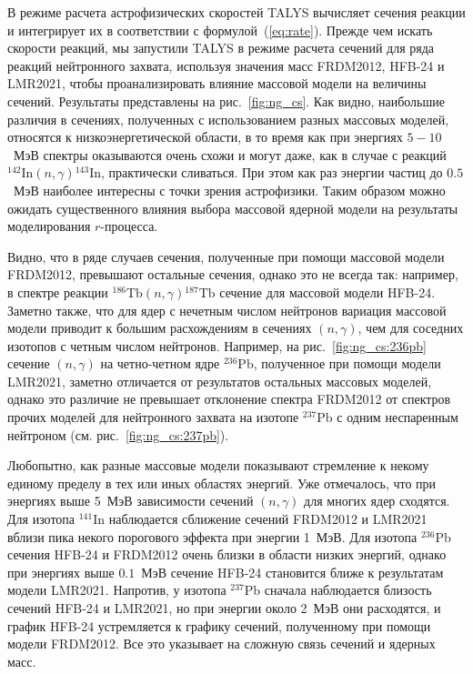 В режиме расчета астрофизических скоростей TALYS вычисляет сечения реакции и интегрирует их в соответствии с формулой~(\ref{eq:rate}). Прежде чем искать скорости реакций, мы запустили TALYS в режиме расчета сечений для ряда реакций нейтронного захвата, используя значения масс FRDM2012, HFB-24 и LMR2021, чтобы проанализировать влияние массовой модели на величины сечений. Результаты представлены на рис.~\ref{fig:ng_cs}. Как видно, наибольшие различия в сечениях, полученных с использованием разных массовых моделей, относятся к низкоэнергетической области, в то время как при энергиях $5-10$~МэВ спектры оказываются очень схожи и могут даже, как в случае с реакций ${}^{142}\text{In}(n,\gamma){}^{143}\text{In}$, практически сливаться. При этом как раз энергии частиц до $0.5$~МэВ наиболее интересны с точки зрения астрофизики. Таким образом можно ожидать существенного влияния выбора массовой ядерной модели на результаты моделирования $r$-процесса.

Видно, что в ряде случаев сечения, полученные при помощи массовой модели FRDM2012, превышают остальные сечения, однако это не всегда так: например, в спектре реакции  ${}^{186}\text{Tb}(n,\gamma){}^{187}\text{Tb}$ сечение для массовой модели HFB-24. Заметно также, что для ядер с нечетным числом нейтронов вариация массовой модели приводит к большим расхождениям в сечениях $(n,\gamma)$, чем для соседних изотопов с четным числом нейтронов. Например, на рис.~\ref{fig:ng_cs:236pb} сечение $(n,\gamma)$ на четно-четном ядре ${}^{236}$Pb, полученное при помощи модели LMR2021, заметно отличается от результатов остальных массовых моделей, однако это различие не превышает отклонение спектра FRDM2012 от спектров прочих моделей для нейтронного захвата на изотопе ${}^{237}$Pb с одним неспаренным нейтроном (см. рис.~\ref{fig:ng_cs:237pb}).

Любопытно, как разные массовые модели показывают стремление к некому единому пределу в тех или иных областях энергий. Уже отмечалось, что при энергиях выше 5~МэВ зависимости сечений $(n,\gamma)$ для многих ядер сходятся. Для изотопа ${}^{141}$In наблюдается сближение сечений FRDM2012 и LMR2021 вблизи пика некого порогового эффекта при энергии 1~МэВ. Для изотопа ${}^{236}$Pb сечения HFB-24 и FRDM2012 очень близки в области низких энергий, однако при энергиях выше $0.1$~МэВ сечение HFB-24 становится ближе к результатам модели LMR2021. Напротив, у изотопа ${}^{237}$Pb сначала наблюдается близость сечений HFB-24 и LMR2021, но при энергии около 2~МэВ они расходятся, и график HFB-24 устремляется к графику сечений, полученному при помощи модели FRDM2012. Все это указывает на сложную связь сечений и ядерных масс.

